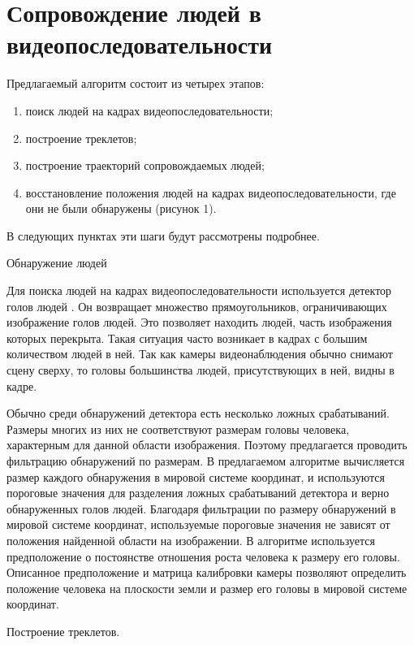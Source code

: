 \chapter{Сопровождение людей в видеопоследовательности} \label{chapt5}


Предлагаемый алгоритм состоит из четырех этапов:
\begin{enumerate}
	\item поиск людей на кадрах видеопоследовательности;
	\item построение треклетов;
	\item построение траекторий сопровождаемых людей;
	\item восстановление положения людей на кадрах видеопоследовательности, где они не были обнаружены (рисунок 1).
\end{enumerate}

В следующих пунктах эти шаги будут рассмотрены подробнее.

Обнаружение людей

Для поиска людей на кадрах видеопоследовательности используется детектор голов людей \cite{prisacariu_reid_tr2310_09}. Он возвращает множество прямоугольников, ограничивающих изображение голов людей. Это позволяет находить людей, часть изображения которых перекрыта. Такая ситуация часто возникает в кадрах с большим количеством людей в ней. Так как камеры видеонаблюдения обычно снимают сцену сверху, то головы большинства людей, присутствующих в ней, видны в
кадре.

Обычно среди обнаружений детектора есть несколько ложных срабатываний. Размеры многих из них не соответствуют размерам головы человека, характерным для данной области
изображения. Поэтому предлагается проводить фильтрацию обнаружений по размерам. В предлагаемом алгоритме вычисляется размер каждого обнаружения в мировой системе координат, и используются пороговые значения для разделения ложных срабатываний детектора и верно обнаруженных голов людей. Благодаря фильтрации по размеру обнаружений в мировой системе координат, используемые пороговые значения не зависят от положения найденной области на изображении. В алгоритме используется предположение о постоянстве отношения роста человека к размеру его головы. Описанное предположение и матрица калибровки камеры позволяют определить положение человека на плоскости земли и размер его головы в мировой системе координат.

Построение треклетов.

